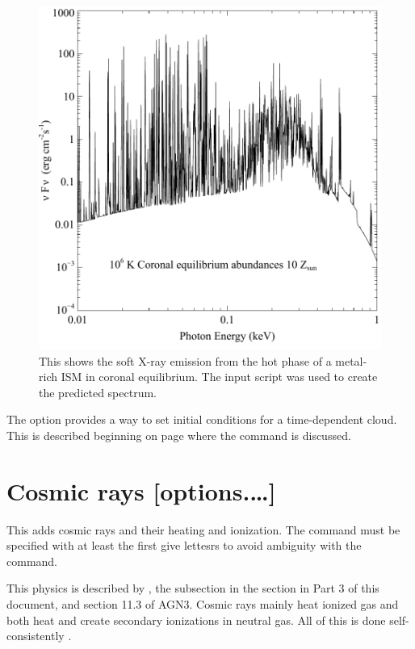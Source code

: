 \begin{figure}
\centering
\includegraphics{coronal}
\caption[X-ray emission spectrum]
{\label{fig:coronal}This shows the soft X-ray emission from
the hot phase of a metal-rich ISM in coronal equilibrium.
The input script  was used
to create the predicted spectrum. }
\end{figure}

The  option provides a way to set initial conditions
for a time-dependent cloud.
This is described beginning on page 
\pageref{sec:TimeVariableRadiationFields}
where the  command is discussed.

\section{Cosmic rays [options.\dots]}

This adds cosmic rays and their heating and ionization.  
The command must be specified with at least the first give lettesrs 
to avoid ambiguity with the  command.

This physics
is described by \citet{FerlandMushotzky1984},
the subsection  in the section 
 in Part 3 of this
document, and section 11.3 of AGN3.
Cosmic rays mainly heat ionized gas
and both heat and create secondary ionizations in neutral gas.
All of this
is done self-consistently \citep{Dalgarno1999}.

